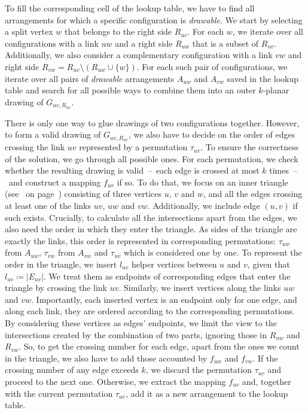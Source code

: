 To fill the corresponding cell of the lookup table, we have to find all arrangements for which a specific configuration is \emph{drawable}. We start by selecting a split vertex \(w\) that belongs to the right side \(R_{uv}\). For each \(w\), we iterate over all configurations with a link \(uw\) and a right side \(R_{uw}\) that is a subset of \(R_{uv}\). Additionally, we also consider a complementary configuration with a link \(vw\) and right side \(R_{vw} = R_{uv} \setminus (R_{uw} \cup \{w\})\). For each such pair of configurations, we iterate over all pairs of \emph{drawable} arrangements \(A_{uw}\) and \(A_{vw}\) saved in the lookup table and search for all possible ways to combine them into an outer \(k\)-planar drawing of \(G_{uv, R_{uv}}\).

There is only one way to glue drawings of two configurations together. However, to form a valid drawing of \(G_{uv, R_{uv}}\), we also have to decide on the order of edges crossing the link \(uv\) represented by a permutation \(\tau_{uv}\). To ensure the correctness of the solution, we go through all possible ones. For each permutation, we check whether the resulting drawing is valid~--~each edge is crossed at most \(k\) times~--~and construct a mapping \(f_{uv}\) if so. To do that, we focus on an inner triangle (see~ on page~\pageref{fig:okp:triangle}) consisting of three vertices \(u\), \(v\) and \(w\), and all the edges crossing at least one of the links \(uv\), \(uw\) and \(vw\). Additionally, we include edge \((u, v)\) if such exists. Crucially, to calculate all the intersections apart from the edges, we also need the order in which they enter the triangle. As sides of the triangle are exactly the links, this order is represented in corresponding permutations: \(\tau_{uw}\) from \(A_{uw}\), \(\tau_{vw}\) from \(A_{vw}\) and \(\tau_{uv}\) which is considered one by one. To represent the order in the triangle, we insert \(l_{uv}\) helper vertices between \(u\) and \(v\), given that \(l_{uv}\coloneq|E_{uv}|\). We treat them as endpoints of corresponding edges that enter the triangle by crossing the link \(uv\). Similarly, we insert vertices along the links \(uw\) and \(vw\). Importantly, each inserted vertex is an endpoint only for one edge, and along each link, they are ordered according to the corresponding permutations. By considering these vertices as edges' endpoints, we limit the view to the intersections created by the combination of two parts, ignoring those in \(R_{uw}\) and \(R_{vw}\). So, to get the crossing number for each edge, apart from the ones we count in the triangle, we also have to add those accounted by \(f_{uw}\) and \(f_{vw}\). If the crossing number of any edge exceeds \(k\), we discard the permutation \(\tau_{uv}\) and proceed to the next one. Otherwise, we extract the mapping \(f_{uv}\) and, together with the current permutation \(\tau_{uv}\), add it as a new arrangement to the lookup table.

